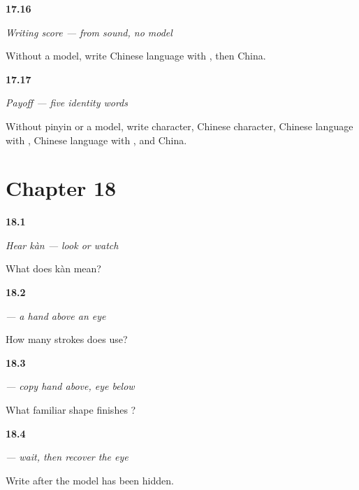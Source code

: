 \noindent\begin{minipage}[t]{\linewidth}
\raggedright
\hypertarget{review-ZH-R17-writing-five-pair}{\textbf{17.16}} \emph{Writing score — from sound, no model}\par
\small Without a model, write Chinese language with , then China.
\end{minipage}\par\medskip

\noindent\begin{minipage}[t]{\linewidth}
\raggedright
\hypertarget{review-ZH-C17-practice-pass}{\textbf{17.17}} \emph{Payoff — five identity words}\par
\small Without pinyin or a model, write character, Chinese character, Chinese language with , Chinese language with , and China.
\end{minipage}\par\medskip

\section*{Chapter 18}

\noindent\begin{minipage}[t]{\linewidth}
\raggedright
\hypertarget{review-ZH-C18-hear-kan-meaning}{\textbf{18.1}} \emph{Hear \emph{kàn} — look or watch}\par
\small What does kàn mean?
\end{minipage}\par\medskip

\noindent\begin{minipage}[t]{\linewidth}
\raggedright
\hypertarget{review-ZH-W18-kan-observe-count}{\textbf{18.2}} \emph{ — a hand above an eye}\par
\small How many strokes does  use?
\end{minipage}\par\medskip

\noindent\begin{minipage}[t]{\linewidth}
\raggedright
\hypertarget{review-ZH-W18-kan-guided-parts}{\textbf{18.3}} \emph{ — copy hand above, eye below}\par
\small What familiar shape finishes ?
\end{minipage}\par\medskip

\noindent\begin{minipage}[t]{\linewidth}
\raggedright
\hypertarget{review-ZH-W18-kan-delayed-write}{\textbf{18.4}} \emph{ — wait, then recover the eye}\par
\small Write  after the model has been hidden.
\end{minipage}\par\medskip

